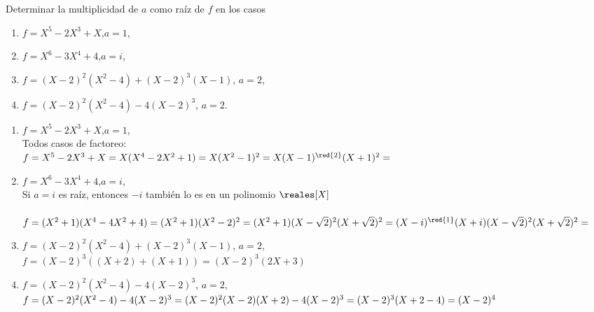 \begin{enunciado}{\ejercicio}
  Determinar la multiplicidad de $a$ como raíz de $f$  en los casos
  \begin{enumerate}[label=\roman*)]
    \item $f = X^5 - 2X^3 + X$,\quad $a=1$,
    \item $f = X^6 - 3X^4 + 4$,\quad $a=i$,
    \item $f = (X-2)^2(X^2-4) + (X-2)^3(X-1)$, \quad $a=2$,
    \item $f = (X-2)^2(X^2-4) - 4(X-2)^3$, \quad $a=2$.
  \end{enumerate}
\end{enunciado}

\begin{enumerate}[label=\roman*)]
  \item $f = X^5 - 2X^3 + X$,\quad $a=1$,\\
        Todos casos de factoreo:\\
        $f = X^5 - 2X^3 + X =
          X(X^4-2X^2 + 1) =
          X(X^2 - 1)^2 =
          X (X - 1)^{\red{2}} (X + 1)^2 =
        $
        \\

  \item $f = X^6 - 3X^4 + 4$,\quad $a=i$,\\
        Si $a=i$ es raíz, entonces $-i$ también lo es en un polinomio $\reales[X]$\\
        \\
        $f =(X^2 + 1)(X^4 - 4X^2 + 4) =
          (X^2 + 1)(X^2-2)^2 =
          (X^2 + 1)(X - \sqrt2)^2 (X + \sqrt2)^2 =\\
          (X - i)^{\red{1}}(X + i)(X - \sqrt2)^2 (X + \sqrt2)^2 =
        $
        \\

  \item $f = (X-2)^2(X^2-4) + (X-2)^3(X-1)$, \quad $a=2$,\\
        $
          f =(X-2)^3 ( (X+2) + (X+1)) =
          (X-2)^3 (2X+3)
        $
        \\

  \item $f = (X-2)^2(X^2-4) - 4(X-2)^3$, \quad $a=2$,\\
        $
          f =
          (X-2)^2(X^2-4) - 4(X-2)^3 =
          (X-2)^2(X-2)(X+2) - 4(X-2)^3 =\\
          (X-2)^3(X+2 - 4) =
          (X-2)^4
        $
        \\

\end{enumerate}

\begin{aportes}
  \item {}
\end{aportes}

